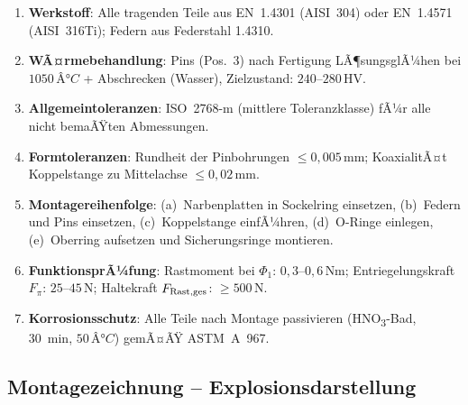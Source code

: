 ﻿\documentclass[12pt, a4paper]{article}
\theoremstyle{remark}
\begin{document}
\begin{enumerate}[noitemsep]
  \item \textbf{Werkstoff}: Alle tragenden Teile aus EN~1.4301 (AISI~304) oder EN~1.4571
        (AISI~316Ti); Federn aus Federstahl 1.4310.
  \item \textbf{WÃ¤rmebehandlung}: Pins (Pos.~3) nach Fertigung LÃ¶sungsglÃ¼hen bei $1050\,Â°C$
        + Abschrecken (Wasser), Zielzustand: $240$--$280\,\text{HV}$.
  \item \textbf{Allgemeintoleranzen}: ISO~2768-m (mittlere Toleranzklasse) fÃ¼r alle
        nicht bemaÃŸten Abmessungen.
  \item \textbf{Formtoleranzen}: Rundheit der Pinbohrungen $\leq 0{,}005\,\text{mm}$;
        KoaxialitÃ¤t Koppelstange zu Mittelachse $\leq 0{,}02\,\text{mm}$.
  \item \textbf{Montagereihenfolge}: (a)~Narbenplatten in Sockelring einsetzen,
        (b)~Federn und Pins einsetzen, (c)~Koppelstange einfÃ¼hren,
        (d)~O-Ringe einlegen, (e)~Oberring aufsetzen und Sicherungsringe montieren.
  \item \textbf{FunktionsprÃ¼fung}: Rastmoment bei $\Phi_1$: $0{,}3$--$0{,}6\,\text{Nm}$;
        Entriegelungskraft $F_\pi$: $25$--$45\,\text{N}$; Haltekraft $F_{\rm Rast,ges}$: $\geq 500\,\text{N}$.
  \item \textbf{Korrosionsschutz}: Alle Teile nach Montage passivieren (HNO\textsubscript{3}-Bad,
        30~min, $50\,Â°C$) gemÃ¤ÃŸ ASTM~A~967.
\end{enumerate}

\subsection{Montagezeichnung -- Explosionsdarstellung}
\end{document}
